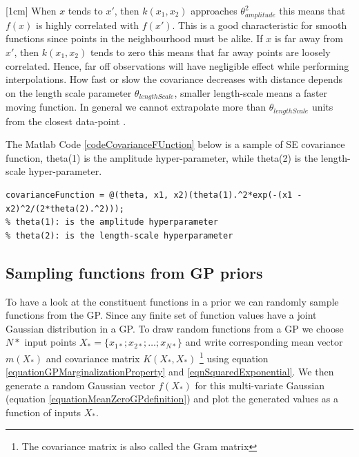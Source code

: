 [1cm]
When $x$ tends to $x'$, then $k(x_{1}, x_{2})$ approaches $\theta_{amplitude}^{2}$ this means that $f(x)$ is highly correlated with $f(x')$. This is a good characteristic for smooth functions since points in the neighbourhood must be alike. If $x$ is far away from  $x'$, then $k(x_{1}, x_{2})$ tends to zero this means that far away points are loosely correlated. Hence, far off observations will have negligible effect while performing interpolations. How fast or slow the covariance decreases with distance depends on the length scale parameter $\theta_{lengthScale}$, smaller length-scale means a faster moving function. In general we cannot extrapolate more than $\theta_{lengthScale}$ units from the closest data-point \cite{duvenaud-thesis-2014}. 

The Matlab Code \ref{codeCovarianceFUnction} below is a sample of SE covariance function, theta(1) is the amplitude hyper-parameter, while theta(2) is the length-scale hyper-parameter.
\begin{mdframed}[hidealllines=true,backgroundcolor=lightgray!20]
\begin{lstlisting}[caption={A SE covariance function}, 
                    captionpos=b, 
                    label={codeCovarianceFUnction},
                    style=Matlab-editor, 
                    backgroundcolor = \color{MatlabCellColour}]
% Standard exponential covariance function
covarianceFunction = @(theta, x1, x2)(theta(1).^2*exp(-(x1 - x2)^2/(2*theta(2).^2))); 
% theta(1): is the amplitude hyperparameter
% theta(2): is the length-scale hyperparameter
\end{lstlisting}
\end{mdframed}

\subsection{Sampling functions from GP priors}\label{subSecSamplingFunctionsGPPrior}
To have a look at the constituent functions in a prior we can randomly sample functions from the GP. Since any finite set of function values have a joint Gaussian distribution in a GP. To draw random functions from a GP we choose $N*$ input points $X_{*} = \{x_{1*}; x_{2*}; \ldots ; x_{N*}\}$ and write corresponding mean vector $m(X_{*})$ and covariance matrix $K(X_{*}, X_{*} )$ \footnote{The covariance matrix is also called the Gram matrix} using equation \ref{equationGPMarginalizationProperty} and \ref{eqnSquaredExponential}. We then generate a random Gaussian vector $f(X_{*})$ for this multi-variate Gaussian (equation \ref{equationMeanZeroGPdefinition}) and plot the generated values as a function of inputs $X_{*}$. 

